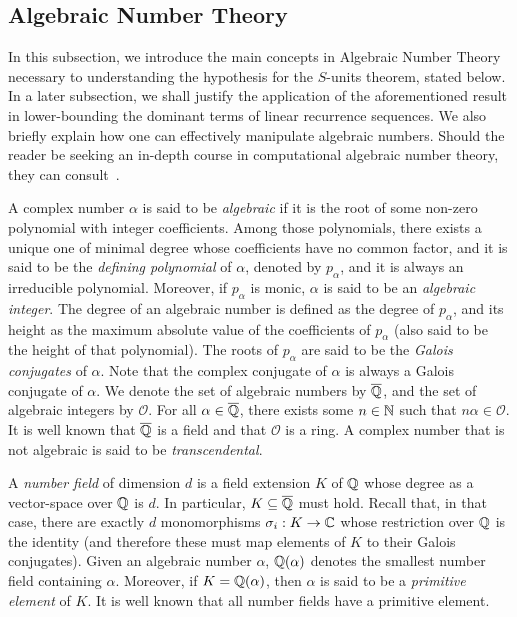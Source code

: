 
\subsection{Algebraic Number Theory}

In this subsection, we introduce the main concepts in Algebraic Number Theory necessary to understanding the hypothesis for the $S$-units theorem, stated below. In a later subsection, we shall justify the application of the aforementioned result in lower-bounding the dominant terms of linear recurrence sequences. We also briefly explain how one can effectively manipulate algebraic numbers. Should the reader be seeking an in-depth course in computational algebraic number theory, they can consult~\cite{Cohen}.

A complex number $\alpha$ is said to be \emph{algebraic} if it is the root of some non-zero polynomial with integer coefficients. Among those polynomials, there exists a unique one of minimal degree whose coefficients have no common factor, and it is said to be the \emph{defining polynomial} of $\alpha$, denoted by $p_{\alpha}$, and it is always an irreducible polynomial. Moreover, if $p_{\alpha}$ is monic, $\alpha$ is said to be an \emph{algebraic integer}. The degree of an algebraic number is defined as the degree of $p_{\alpha}$, and its height as the maximum absolute value of the coefficients of $p_{\alpha}$ (also said to be the height of that polynomial). The roots of $p_{\alpha}$ are said to be the \emph{Galois conjugates} of $\alpha$. Note that the complex conjugate of $\alpha$ is always a Galois conjugate of $\alpha$.
We denote the set of algebraic numbers by $\overline{\mathbb{Q}}$, and the set of algebraic integers by $\mathcal{O}$. For all $\alpha \in \overline{\mathbb{Q}}$, there exists some $n\in\mathbb{N}$ such that $n \alpha \in \mathcal{O}$. It is well known that $\overline{\mathbb{Q}}$ is a field and that $\mathcal{O}$ is a ring. A complex number that is not algebraic is said to be \emph{transcendental}.

A \emph{number field} of dimension $d$ is a field extension $K$ of $\mathbb{Q}$ whose degree as a vector-space over $\mathbb{Q}$ is $d$. In particular, $K\subseteq\overline{\mathbb{Q}}$ must hold.
Recall that, in that case, there are exactly $d$ monomorphisms $\sigma_{i} : K \rightarrow \mathbb{C}$ whose restriction over $\mathbb{Q}$ is the identity (and therefore these must map elements of $K$ to their Galois conjugates).
Given an algebraic number $\alpha$, $\mathbb{Q}(\alpha)$ denotes the smallest number field containing $\alpha$. Moreover, if $K=\mathbb{Q}(\alpha)$, then $\alpha$ is said to be a \emph{primitive element} of $K$. It is well known that all number fields have a primitive element.

